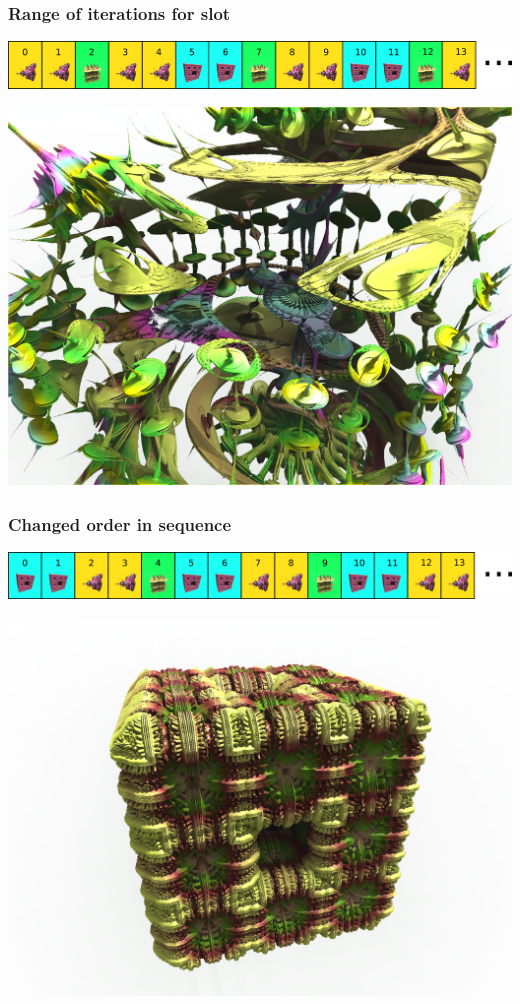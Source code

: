 \subsubsection{Range of iterations for slot}

\includegraphics[width=\linewidth]{img/manual/media/iteration_loop_hybrid_sequence_4.png}

\includegraphics[width=0.5\linewidth]{img/manual/media/hybrid_sequence_example_4.png}

\subsubsection{Changed order in sequence}

\includegraphics[width=\linewidth]{img/manual/media/iteration_loop_hybrid_sequence_5.png}

\includegraphics[width=0.5\linewidth]{img/manual/media/hybrid_sequence_example_5.png}
